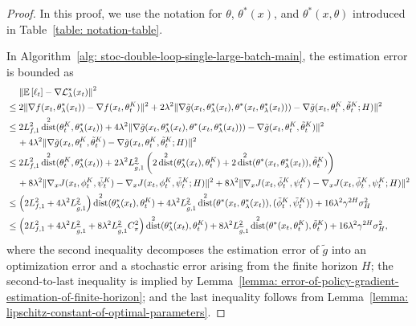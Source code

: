 \documentclass{article}
\theoremstyle{plain}
\theoremstyle{definition}
\theoremstyle{remark}
\DeclareMathOperator{\dist}{dist}
\def\E{\mathbb E}
\def\cL{\mathcal L}
\begin{document}
\begin{proof}
In this proof, we use the notation for $\theta$, $\theta^*(x)$, and
$\theta^*(x,\theta)$ introduced in Table~\ref{table: notation-table}.
    
    In Algorithm~\ref{alg: stoc-double-loop-single-large-batch-main}, the estimation error is bounded as 
    \begin{align}
        & \quad \, \left\| \E\left[\ell_{t} \right] - \nabla \cL_\lambda^*(x_t)\right\|^2 \notag \\
        & \leq  2\| \nabla f(x_t,\theta_\lambda^*(x_t)) - \nabla f(x_t,\theta_t^{K}) \|^2 + 2 \lambda^2 \|\nabla \tilde{g}(x_t,\theta_\lambda^*(x_t),\theta^*(x_t,\theta^*_\lambda(x_t)))  - \nabla \tilde{g}(x_t,\theta_t^K,\tilde{\theta}_t^K;H)\|^2  \notag  \\
        & \leq 2L_{f,1}^2 \dist^2(\theta_t^{K}, \theta_\lambda^*(x_t)) + 4\lambda^2 \|\nabla \tilde{g}(x_t,\theta_\lambda^*(x_t),\theta^*(x_t,\theta^*_\lambda(x_t)))  - \nabla \tilde{g}(x_t,\theta_t^K,\tilde{\theta}_t^K)\|^2  \notag \\
        & \quad \, + 4\lambda^2 \|\nabla \tilde{g}(x_t,\theta_t^K,\tilde{\theta}_t^K) - \nabla \tilde{g}(x_t,\theta_t^K,\tilde{\theta}_t^K;H)\|^2 \notag\\
        & \leq 2L_{f,1}^2 \dist^2(\theta_t^{K}, \theta_\lambda^*(x_t)) + 2\lambda^2L_{\widetilde{g},1}^2\left(2 \dist^2(\theta_\lambda^*(x_t),\theta_t^K) + 2 \dist^2 (\theta^*(x_t,\theta_\lambda^*(x_t)), \tilde{\theta}_t^K) \right) \notag \\
        & \quad \, + 8\lambda^2 \|\nabla_x J(x_t,\phi_t^K,\tilde{\psi}_t^K) - \nabla_x J(x_t,\phi_t^K,\tilde{\psi}_t^K;H)\|^2 + 8\lambda^2 \|\nabla_x J(x_t,\tilde{\phi}_t^K,\psi_t^K) - \nabla_x J(x_t,\tilde{\phi}_t^K,\psi_t^K;H)\|^2 \notag\\ 
        & \leq  \left(2L_{f,1}^2 + 4 \lambda^2L_{\widetilde{g},1}^2\right) \dist^2 (\theta^*_\lambda(x_t), \theta_t^{K}) + 4 \lambda^2L_{\widetilde{g},1}^2 \dist^2 (\theta^*(x_t,\theta_\lambda^*(x_t)), (\tilde{\phi}_{t}^K,\tilde{\psi}_{t}^K)) + 16 \lambda^2 \gamma^{2H} \sigma_H^2 \notag\\
        & \leq \left(2L_{f,1}^2 + 4 \lambda^2L_{\widetilde{g},1}^2 + 8 \lambda^2 L_{\widetilde{g},1}^2 C_\pi^2\right) \dist^2 (\theta^*_\lambda(x_t), \theta_t^{K}) + 8\lambda^2L_{\widetilde{g},1}^2 \dist^2 (\theta^*(x_t,\theta_t^K), \tilde{\theta}_t^K) + 16 \lambda^2 \gamma^{2H} \sigma_H^2 ,  \label{eq: recursion-of-stochastic-error-1-large-batch}
    \end{align}
    where the second inequality decomposes the estimation error of $\tilde{g}$ into an optimization error and a stochastic error arising from the finite horizon $H$; the second-to-last inequality is implied by Lemma~\ref{lemma: error-of-policy-gradient-estimation-of-finite-horizon}; and the last inequality follows from Lemma~\ref{lemma: lipschitz-constant-of-optimal-parameters}.


\end{proof}
\end{document}
